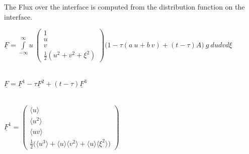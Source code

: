 \documentclass[
	pdftex,             %
	12pt,				%
	a4paper,		   	%
	english,				%
	oneside,			%
]{article}
\newcommand{\mom}[1]{\langle #1 \rangle}
\newcommand{\uu}[1]{\underline{#1}}
\begin{document}
\clearpage

The Flux over the interface is computed from the distribution function on the interface. 

\begin{math}
\uu{F} = 
\int \limits_{-\infty}^{\infty}
u~
\begin{pmatrix}
	1 \\ u \\ v \\ \frac{1}{2} (u^2 + v^2 + \xi^2)
\end{pmatrix}
\Big(
	1 - \tau (a~u + b~v) + (t-\tau)A
\Big)
~g~ du dv d\xi
\end{math}

~\\

\begin{math}
\uu{F} = \uu{F}^1 - \tau \uu{F}^2 + (t - \tau) \uu{F}^3
\end{math}

~\\

\begin{math}
\uu{F}^1 =
\begin{pmatrix}
\mom{u} \\ 
\mom{u^2} \\ 
\mom{uv} \\ 
\frac{1}{2} \big(\mom{u^3} + \mom{u}\mom{v^2} + \mom{u}\mom{\xi^2} \big)
\end{pmatrix}
\end{math}

~\\
\end{document}
